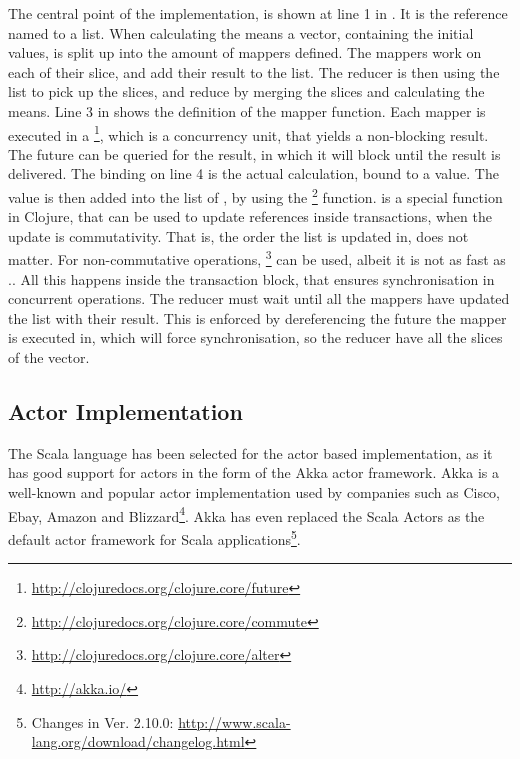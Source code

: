 The central point of the implementation, is shown at line 1 in . It is the reference named  to a list. When calculating the means a vector, containing the initial values, is split up into the amount of mappers defined. The mappers work on each of their slice, and add their result to the list. The reducer is then using the list to pick up the slices, and reduce by merging the slices and calculating the means. Line 3 in shows the definition of the mapper function. Each mapper is executed in a \footnote{\url{http://clojuredocs.org/clojure.core/future}}, which is a concurrency unit, that yields a non-blocking result. The future can be queried for the result, in which it will block until the result is delivered. The  binding on line 4 is the actual calculation, bound to a value. The  value is then added into the list of , by using the \footnote{\url{http://clojuredocs.org/clojure.core/commute}} function.  is a special function in Clojure, that can be used to update references inside transactions, when the update is commutativity. That is, the order the list is updated in, does not matter. For non-commutative operations, \footnote{\url{http://clojuredocs.org/clojure.core/alter}} can be used, albeit it is not as fast as .. All this happens inside the  transaction block, that ensures synchronisation in concurrent operations. The reducer must wait until all the mappers have updated the list with their result. This is enforced by dereferencing the future the mapper is executed in, which will force synchronisation, so the reducer have all the slices of the vector.

\subsection{Actor Implementation}
The Scala language has been selected for the actor based implementation, as it has good support for actors in the form of the Akka actor framework. Akka is a well-known and popular actor implementation used by companies such as Cisco, Ebay, Amazon and Blizzard\footnote{\url{http://akka.io/}}. Akka has even replaced the Scala Actors as the default actor framework for Scala applications\footnote{Changes in Ver. 2.10.0: \url{http://www.scala-lang.org/download/changelog.html}}.

